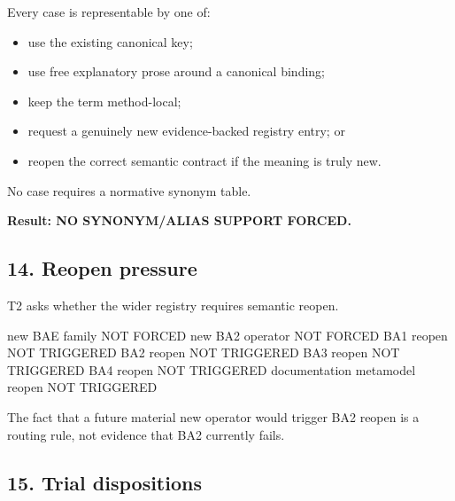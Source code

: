\documentclass[
  10pt,
  a4paper,
]{article}
\newenvironment{Shaded}{}{}
\newcommand{\NormalTok}[1]{#1}
\providecommand{\tightlist}{%
  \setlength{\itemsep}{0pt}\setlength{\parskip}{0pt}}
\begin{document}
Every case is representable by one of:

\begin{itemize}
\tightlist
\item
  use the existing canonical key;
\item
  use free explanatory prose around a canonical binding;
\item
  keep the term method-local;
\item
  request a genuinely new evidence-backed registry entry; or
\item
  reopen the correct semantic contract if the meaning is truly new.
\end{itemize}

No case requires a normative synonym table.

\textbf{Result: NO SYNONYM/ALIAS SUPPORT FORCED.}

\subsection{14. Reopen pressure}\label{reopen-pressure}

T2 asks whether the wider registry requires semantic reopen.

\begin{Shaded}
\begin{Highlighting}[]
\NormalTok{new BAE family                         NOT FORCED}
\NormalTok{new BA2 operator                       NOT FORCED}
\NormalTok{BA1 reopen                             NOT TRIGGERED}
\NormalTok{BA2 reopen                             NOT TRIGGERED}
\NormalTok{BA3 reopen                             NOT TRIGGERED}
\NormalTok{BA4 reopen                             NOT TRIGGERED}
\NormalTok{documentation metamodel reopen         NOT TRIGGERED}
\end{Highlighting}
\end{Shaded}

The fact that a future material new operator would trigger BA2 reopen is
a routing rule, not evidence that BA2 currently fails.

\subsection{15. Trial dispositions}\label{trial-dispositions}
\end{document}
